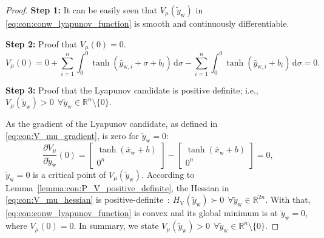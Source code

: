 \begin{proof}

    \textbf{Step 1:} 
    It can be easily seen that $V_\mu(\tilde{y}_\mathrm{w})$ in \eqref{eq:con:conw_lyapunov_function} is smooth and continuously differentiable.
    
    \textbf{Step 2:} Proof that $V_\mu(0) = 0$.
    \begin{equation}
        V_\mu(0) = 0 + \sum_{i=1}^n \int_{0}^{0} \tanh(\bar{y}_{\mathrm{w},i}+\sigma+b_i) \, \mathrm{d} \sigma - \sum_{i=1}^n \int_{0}^{0} \tanh(\bar{y}_{\mathrm{w},i}+b_i) \, \mathrm{d} \sigma = 0.
    \end{equation}
    
    \textbf{Step 3:} Proof that the Lyapunov candidate is positive definite; i.e., $V_\mu(\tilde{y}_\mathrm{w}) > 0 \: \: \forall \tilde{y}_\mathrm{w} \in \mathbb{R}^n \setminus \{0 \}$.
    
    As the gradient of the Lyapunov candidate, as defined in \eqref{eq:con:V_mu_gradient}, is zero for $\tilde{y}_\mathrm{w} = 0$: \begin{equation}
        \frac{\partial V_\mu}{\partial \tilde{y}_\mathrm{w}}(0) = \begin{bmatrix}
            \tanh(\bar{x}_\mathrm{w} + b)\\ 
            0^{n}
        \end{bmatrix} - \begin{bmatrix}
            \tanh(\bar{x}_\mathrm{w} + b)\\ 
            0^{n}
        \end{bmatrix} = 0,
    \end{equation}
    $\tilde{y}_\mathrm{w} = 0$ is a critical point of $V_\mu(\tilde{y}_\mathrm{w})$. 
    According to Lemma~\ref{lemma:con:P_V_positive_definite}, the Hessian in \eqref{eq:con:V_mu_hessian} is positive-definite~\cite{boyd2004convex}: $H_\mathrm{V}(\tilde{y}_\mathrm{w}) \succ 0 \: \: \forall \tilde{y}_\mathrm{w} \in \mathbb{R}^{2n}$.
    With that, \eqref{eq:con:conw_lyapunov_function} is convex and its global minimum is at $\tilde{y}_\mathrm{w} = 0$, where $V_\mu(0) = 0$. In summary, we state $V_\mu(\tilde{y}_\mathrm{w}) > 0 \: \: \forall \tilde{y}_\mathrm{w} \in \mathbb{R}^n \setminus \{0 \}$.


\end{proof}
